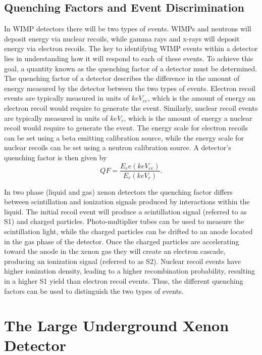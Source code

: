 \documentclass[a4paper,12pt]{article}
\begin{document}
\subsection{Quenching Factors and Event Discrimination}
In WIMP detectors there will be two types of events.  WIMPs and neutrons will deposit energy via nuclear recoils, while gamma rays and x-rays will deposit energy via electron recoils.  The key to identifying WIMP events within a detector lies in understanding how it will respond to each of these events.  To achieve this goal, a quantity known as the quenching factor of a detector must be determined.  The quenching factor of a detector describes the difference in the amount of energy measured by the detector between the two types of events.  Electron recoil events are typically measured in units of $keV_{ee}$, which is the amount of energy an electron recoil would require to generate the event.  Similarly, nuclear recoil events are typically measured in units of $keV_r$, which is the amount of energy a nuclear recoil would require to generate the event.  The energy scale for electron recoils can be set using a beta emitting calibration source, while the energy scale for nuclear recoils can be set using a neutron calibration source.  A detector's quenching factor is then given by
\[QF=\frac{E_ee(keV_{ee})}{E_r(keV_{r})}.\]

In two phase (liquid and gas) xenon detectors the quenching factor differs between scintillation and ionization signals produced by interactions within the liquid.  The initial recoil event will produce a scintillation signal (referred to as S1) and charged particles.  Photo-multiplier tubes can be used to measure the scintillation light, while the charged particles can be drifted to an anode located in the gas phase of the detector.  Once the charged particles are accelerating toward the anode in the xenon gas they will create an electron cascade, producing an ionization signal (referred to as S2).  Nuclear recoil events have higher ionization density, leading to a higher recombination probability, resulting in a higher S1 yield than electron recoil events. Thus, the different quenching factors can be used to distinguish the two types of events.


\section{The Large Underground Xenon Detector}
\end{document}
